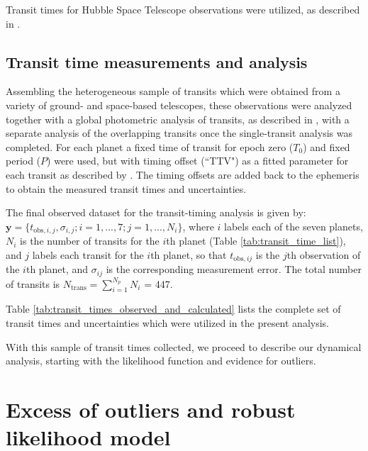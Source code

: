 \documentclass[twocolumn]{aastex63}
\begin{document}
Transit times for Hubble Space Telescope observations were utilized, as described in \citet{Grimm2018,deWit2016,deWit2018,Wakeford2018}.

\subsection{Transit time measurements and analysis}\label{sec:transit_time_measurements}


Assembling the heterogeneous sample of transits which were obtained from a variety of ground- and space-based telescopes,  these observations were analyzed together
with a global photometric analysis of transits, as described in 
\citet{Ducrot2020}, with a separate analysis of the overlapping transits once the single-transit analysis was completed.
For each planet a fixed time of transit for epoch zero ($T_{0}$) and fixed period ($P$) were used, but with timing offset (``TTV") as a fitted parameter for each transit as described by \cite{Ducrot2020}.  The timing offsets are added back
to the ephemeris to obtain the measured transit times and uncertainties.

The final observed dataset for the transit-timing analysis
is given by: $\mathbf{y} = \{t_{\mathrm{obs},i,j},\sigma_{i,j}; i=1,...,7; j = 1,...,N_i\}$, where $i$ labels each of the seven planets, $N_i$ is
the number of transits for the $i$th planet (Table \ref{tab:transit_time_list}),
and $j$ labels each transit for the $i$th planet, so that
$t_{\mathrm{obs},ij}$ is the $j$th observation of the $i$th planet, and
$\sigma_{ij}$ is the corresponding measurement error.  The total number of transits is $N_\mathrm{trans} = \sum_{i=1}^{N_p} N_i$ = 447.

Table \ref{tab:transit_times_observed_and_calculated} lists the complete set
of transit times and uncertainties which were utilized in the present analysis.

With this sample of transit times collected, we proceed to describe our
dynamical analysis, starting with the likelihood function and evidence for outliers.

\section{Excess of outliers and robust likelihood model} \label{sec:outliers}
\end{document}
